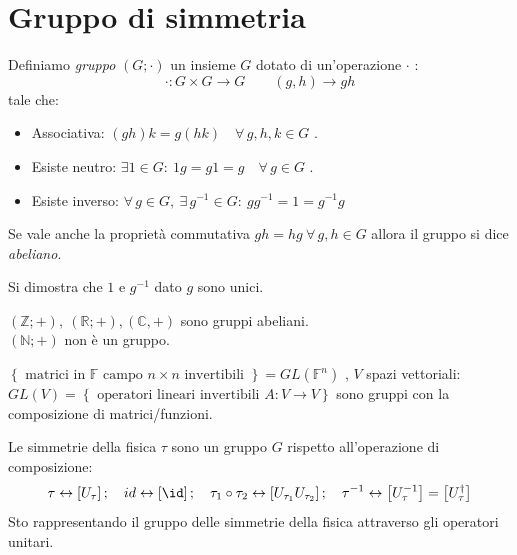 \section{Gruppo di simmetria}
\begin{definition}
    Definiamo \textit{gruppo} \((G; \cdot )\) un insieme \(G\) dotato di un'operazione \(\cdot \) :
    \begin{equation}
        \cdot : G \times G \to G \qquad (g,h)\to gh
    \end{equation}
    tale che:
    \begin{itemize}
        \item Associativa: \((gh)k= g(hk) \quad \forall\, g,h,k \in G\) .
        \item Esiste neutro: \(\exists 1 \in G :\ 1g = g1 = g \quad \forall \, g \in G\) .
        \item Esiste inverso: \(\forall \, g \in G , \ \exists\, g^{-1}\in G : \ gg^{-1}= 1 = g^{-1}g\)
    \end{itemize}
\end{definition}
Se vale anche la proprietà commutativa \(gh = hg \ \forall\, g,h \in G\) allora il gruppo si dice \textit{abeliano}.
\begin{remark}
    Si dimostra che \(1\) e \(g^{-1}\) dato \(g\) sono unici.
\end{remark}

\begin{example}
    \((\mathbb{Z}; + ), \ (\mathbb{R}; +), (\mathbb{C}, +)\) sono gruppi abeliani. \\
    \((\mathbb{N}; +)\) non è un gruppo.
\end{example}
\begin{example}
    \(\left\{ \text{ matrici in } \mathbb{F} \text{ campo } n\times n \text{ invertibili } \right\}= GL(\mathbb{F}^n)\) , 
    \(V\) spazi vettoriali: \(GL(V)= \left\{ \text{ operatori lineari invertibili } A: V\to V\right\}\) sono gruppi con la composizione di matrici/funzioni.
\end{example}

Le simmetrie della fisica \(\tau\) sono un gruppo \(G\) rispetto all'operazione di composizione:
\[
    \tau \leftrightarrow \left[ U_\tau \right]; \quad id \leftrightarrow \left[ \id \right]  ;\quad \tau_1\circ \tau_2 \leftrightarrow \left[ U_{\tau_1} U_{\tau_2} \right]; \quad
    \tau^{-1}\leftrightarrow \left[ U^{-1}_\tau \right] = \left[ U^\dagger _\tau \right]
\]
Sto rappresentando il gruppo delle simmetrie della fisica attraverso gli operatori unitari.

